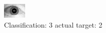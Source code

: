 \begin{figure}[h!]
\begin{center}
\includegraphics[width=0.60\columnwidth]{figures/ID1786_class_3_target_2.png}
\end{center}
\caption{ Classification: 3 actual target: 2}
\label{fig:ID1786_class_3_target_2}
\end{figure}
